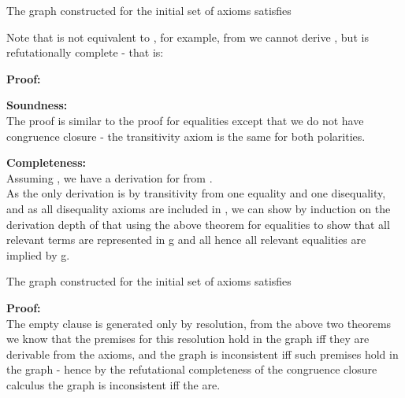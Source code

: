 \begin{theorem}
The graph  constructed for the initial set of axioms  satisfies 

Note that  is not equivalent to , for example, from  we cannot derive , but  is refutationally complete - that is:\\

\noindent
\textbf{Proof:}

\noindent
\textbf{Soundness:}\\
The proof is similar to the proof for equalities except that we do not have congruence closure - the transitivity axiom is the same for both polarities.\\
\QED

\noindent
\textbf{Completeness:}\\
Assuming ,  we have a derivation  for  from .\\
As the only derivation is by transitivity from one equality and one disequality, and as all disequality axioms are included in , 
we can show by induction on the derivation depth of  that  using the above theorem for equalities to show that all relevant terms are represented in g and all hence all relevant equalities are implied by g.\\
\QED
\end{theorem}

\begin{theorem}

The graph  constructed for the initial set of axioms  satisfies \\

\noindent
\textbf{Proof:}\\
The empty clause is generated only by resolution, from the above two theorems we know that the premises for this resolution hold in the graph iff they are derivable from the axioms, and the graph is inconsistent iff such premises hold in the graph - hence by the refutational completeness of the congruence closure calculus the graph is inconsistent iff the  are.\\
\QED
\end{theorem}

